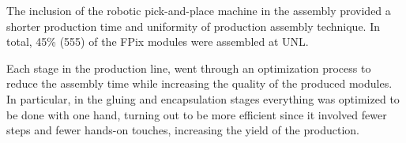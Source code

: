 The inclusion of the robotic pick-and-place machine in the assembly provided a shorter production time and uniformity of production assembly technique. In total, 45\% (555) of the FPix modules were assembled at UNL.  

Each stage in the production line, went through an optimization process to reduce the assembly time while increasing the quality of the produced modules. In particular, in the gluing and encapsulation stages everything was optimized to be done with one hand, turning out to be more efficient since it involved fewer steps and fewer hands-on touches, increasing the yield of the production.

